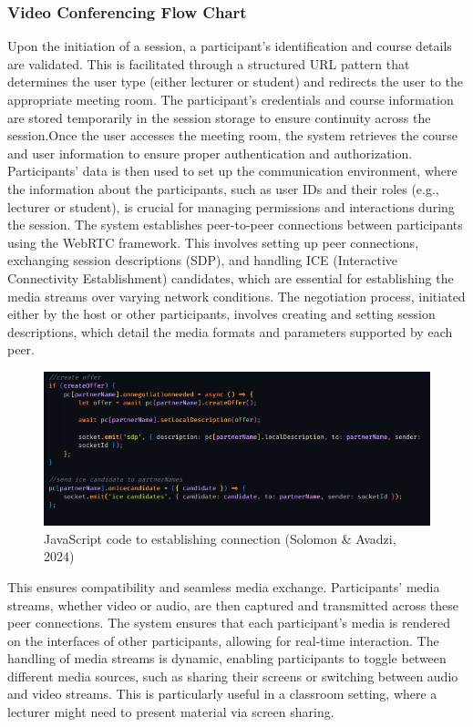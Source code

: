 \documentclass[a4paper,12pt]{article}  %
\begin{document}
\subsubsection{Video Conferencing Flow Chart}
Upon the initiation of a session, a participant’s identification and course
details are validated. This is facilitated through a structured URL pattern
that determines the user type (either lecturer or student) and redirects the
user to the appropriate meeting room. The participant's credentials and course
information are stored temporarily in the session storage to ensure continuity
across the session.Once the user accesses the meeting room, the system
retrieves the course and user information to ensure proper authentication and
authorization. Participants' data is then used to set up the communication
environment, where the information about the participants, such as user IDs and
their roles (e.g., lecturer or student), is crucial for managing permissions
and interactions during the session. The system establishes peer-to-peer
connections between participants using the WebRTC framework. This involves
setting up peer connections, exchanging session descriptions (SDP), and
handling ICE (Interactive Connectivity Establishment) candidates, which are
essential for establishing the media streams over varying network conditions.
The negotiation process, initiated either by the host or other participants,
involves creating and setting session descriptions, which detail the media
formats and parameters supported by each peer. \\
\begin{figure}[H]
      \centering
      \includegraphics[width=1\textwidth]{figures/create-offer.png}
      \caption{JavaScript code to establishing connection (Solomon \& Avadzi, 2024)}
\end{figure}
This ensures compatibility and seamless media exchange. Participants' media streams, whether video or audio, are then captured and transmitted across these peer connections. The system ensures that each participant's media is rendered on the interfaces of other participants, allowing for real-time interaction. The handling of media streams is dynamic, enabling participants to toggle between different media sources, such as sharing their screens or switching between audio and video streams. This is particularly useful in a classroom setting, where a lecturer might need to present material via screen sharing.\\
\end{document}
